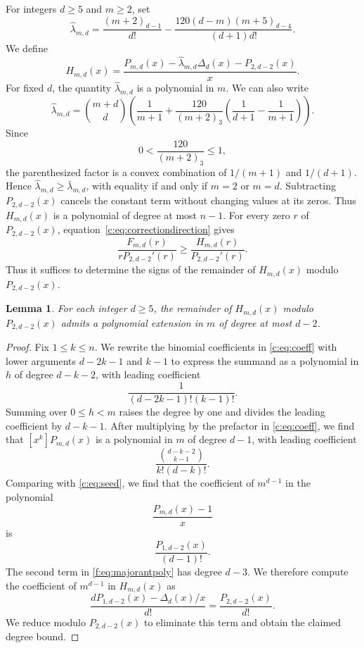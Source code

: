 \documentclass[10pt,a4paper]{article}
\numberwithin{equation}{section}
\newtheorem{lemma}[theorem]{Lemma}
\theoremstyle{remark}\newtheorem{remark}[theorem]{Remark}
\begin{document}
For integers $d\ge5$ and $m\ge2$, set
\begin{equation}\label{f:eq:majorantpoly}
 \widehat\lambda_{m,d}=\frac{(m+2)_{d-1}}{d!}
       -\frac{120(d-m)(m+5)_{d-4}}{(d+1)d!}.
\end{equation}
We define
\[
 H_{m,d}(x)=\frac{P_{m,d}(x)-\widehat\lambda_{m,d}\Delta_d(x)-P_{2,d-2}(x)}x.
\]
For fixed $d$, the quantity $\widehat\lambda_{m,d}$ is a polynomial in $m$.
We can also write
\[
 \widehat\lambda_{m,d}=\binom{m+d}{d}
 \left(\frac1{m+1}+\frac{120}{(m+2)_3}
 \left(\frac1{d+1}-\frac1{m+1}\right)\right).
\]
Since
\[
 0<\frac{120}{(m+2)_3}\le1,
\]
the parenthesized factor is a convex
combination of $1/(m+1)$ and $1/(d+1)$. Hence
$\widehat\lambda_{m,d}\ge\bar\lambda_{m,d}$, with equality if and only if
$m=2$ or $m=d$.
Subtracting $P_{2,d-2}(x)$ cancels the constant term without changing values
at its zeros. Thus $H_{m,d}(x)$ is a polynomial of degree at most $n-1$. For every zero
$r$ of $P_{2,d-2}(x)$, equation~\eqref{c:eq:correctiondirection} gives
\begin{equation}\label{f:eq:uppernodes}
 \frac{F_{m,d}(r)}{rP_{2,d-2}'(r)}\ge\frac{H_{m,d}(r)}{P_{2,d-2}'(r)}.
\end{equation}
Thus it suffices to determine the signs of the remainder of
$H_{m,d}(x)$ modulo $P_{2,d-2}(x)$.
\begin{lemma}\label{f:lem:polynomial}
For each integer $d\ge5$, the remainder of $H_{m,d}(x)$ modulo
$P_{2,d-2}(x)$ admits a polynomial extension in $m$ of degree at most $d-2$.
\end{lemma}
\begin{proof}
Fix $1\le k\le n$. We rewrite the binomial coefficients in
\eqref{c:eq:coeff} with lower arguments $d-2k-1$ and $k-1$ to express
the summand as a polynomial in $h$ of degree $d-k-2$, with leading coefficient
\[
 \frac1{(d-2k-1)!(k-1)!}.
\]
Summing over $0\le h<m$ raises the degree by one and divides the leading
coefficient by $d-k-1$. After multiplying by the prefactor in
\eqref{c:eq:coeff}, we find that $[x^k]P_{m,d}(x)$ is a polynomial
in $m$ of degree $d-1$, with leading coefficient
\[
 \frac{\binom{d-k-2}{k-1}}{k!(d-k)!}.
\]
Comparing with \eqref{c:eq:seed}, we find that the coefficient of
$m^{d-1}$ in the polynomial
\[
 \frac{P_{m,d}(x)-1}x
\]
is
\[
 \frac{P_{1,d-2}(x)}{(d-1)!}.
\]
The second term in \eqref{f:eq:majorantpoly} has degree $d-3$.
We therefore compute the coefficient of
$m^{d-1}$ in $H_{m,d}(x)$ as
\[
 \frac{dP_{1,d-2}(x)-\Delta_d(x)/x}{d!}=\frac{P_{2,d-2}(x)}{d!}.
\]
We reduce modulo $P_{2,d-2}(x)$ to eliminate this term and obtain the claimed degree bound.
\end{proof}
\end{document}
